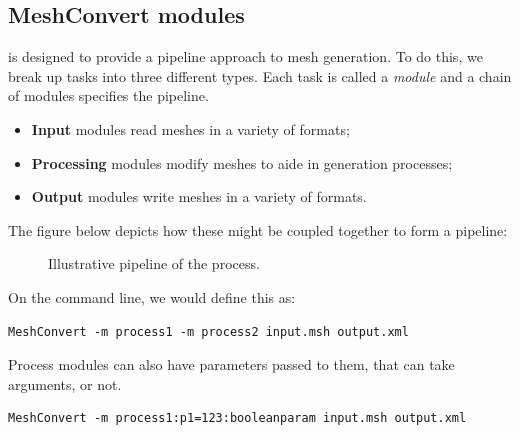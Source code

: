 \subsection{MeshConvert modules}

\mc is designed to provide a pipeline approach to mesh generation. To do this,
we break up tasks into three different types. Each task is called a
\emph{module} and a chain of modules specifies the pipeline.
%
\begin{itemize}
  \item \textbf{Input} modules read meshes in a variety of formats;
  \item \textbf{Processing} modules modify meshes to aide in generation processes;
  \item \textbf{Output} modules write meshes in a variety of formats.
\end{itemize}
%
The figure below depicts how these might be coupled together to form a pipeline:
%
\begin{figure}
  \begin{center}
  \end{center}
  \caption{Illustrative pipeline of the \mc process.}
  \label{fig:util:mc:pipeline}
\end{figure}
%
On the command line, we would define this as:
%
\begin{lstlisting}[style=BashInputStyle]
  MeshConvert -m process1 -m process2 input.msh output.xml
\end{lstlisting}
%
Process modules can also have parameters passed to them, that can take
arguments, or not.
%
\begin{lstlisting}[style=BashInputStyle]
  MeshConvert -m process1:p1=123:booleanparam input.msh output.xml
\end{lstlisting}
